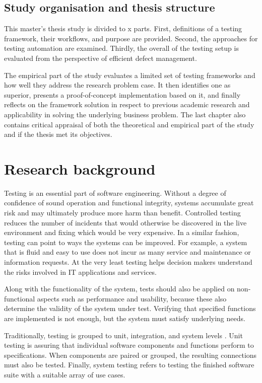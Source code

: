 \documentclass[12pt,a4paper,oneside,pdftex]{report}
\begin{document}
\section{Study organisation and thesis structure}
\label{section:structure}
This master's thesis study is divided to x parts. First, definitions of a testing framework, their workflows, and purpose are provided. Second, the approaches for testing automation are examined. Thirdly, the overall of the testing setup is evaluated from the perspective of efficient defect management. 

The empirical part of the study evaluates a limited set of testing frameworks and how well they address the research problem case. It then identifies one as superior, presents a proof-of-concept implementation based on it, and finally reflects on the framework solution in respect to previous academic research and applicability in solving the underlying business problem. The last chapter also contains critical appraisal of both the theoretical and empirical part of the study and if the thesis met its objectives.

\chapter{Research background}
\label{chapter:background}

Testing is an essential part of software engineering. Without a degree of confidence of sound operation and functional integrity, systems accumulate great risk and may ultimately produce more harm than benefit. Controlled testing reduces the number of incidents that would otherwise be discovered in the live environment and fixing which would be very expensive. In a similar fashion, testing can point to ways the systems can be improved. For example, a system that is fluid and easy to use does not incur as many service and maintenance or information requests. At the very least testing helps decision makers understand the risks involved in IT applications and services.

Along with the functionality of the system, tests should also be applied on non-functional aspects such as performance and usability, because these also determine the validity of the system under test. Verifying that specified functions are implemented is not enough, but the system must satisfy underlying needs.

Traditionally, testing is grouped to unit, integration, and system levels \citep{jenkins2008software, burnstein2003practical}. Unit testing is assuring that individual software components and functions perform to specifications. When components are paired or grouped, the resulting connections must also be tested. Finally, system testing refers to testing the finished software suite with a suitable array of use cases.
\end{document}
